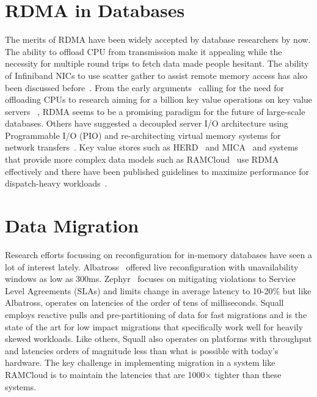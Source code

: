 \section{RDMA in Databases}
The merits of RDMA have been widely accepted by database researchers by now. The 
ability to offload CPU from transmission make it appealing while the necessity for 
multiple round trips to fetch data made people hesitant. The ability of Infiniband NICs to 
use scatter gather to assist remote memory access has also been discussed before~\cite{zerocopy04}.
From the early arguments~\cite{rdmacase} calling for the need for offloading CPUs to 
research aiming for a billion key value operations on key value servers ~\cite{rdmabillion},
RDMA seems to be a promising paradigm for the future of large-scale databases. Others have suggested
a decoupled server I/O architecture using Programmable I/O (PIO) and re-architecting virtual 
memory systems for network transfers~\cite{hicamp}. Key value stores
such as HERD~\cite{herd} and MICA~\cite{mica} and systems that provide more complex
data models such as RAMCloud~\cite{ramcloud} use RDMA effectively and there have been 
published guidelines to maximize performance for dispatch-heavy workloads~\cite{rdma}.

\section{Data Migration}
Research efforts focussing on reconfiguration for in-memory databases have seen a lot of 
interest lately. Albatross~\cite{albatross} offered live reconfiguration with unavailability windows as low as 
300ms. Zephyr~\cite{zephyr} focuses on mitigating violations to Service Level Agreements (SLAs) and limits 
change in average latency to 10-20\% but like Albatross, operates on latencies of the order of tens of milliseconds.  
Squall~\cite{squall} employs reactive pulls and pre-partitioning
of data for fast migrations and is the state of the art for low impact migrations that specifically work well for 
heavily skewed workloads. Like others, Squall also operates on platforms with throughput and latencies orders of 
magnitude less than what is possible with today's hardware. The key challenge in implementing migration in a system 
like RAMCloud is to maintain the latencies that are 1000$\times$ tighter than these systems.

